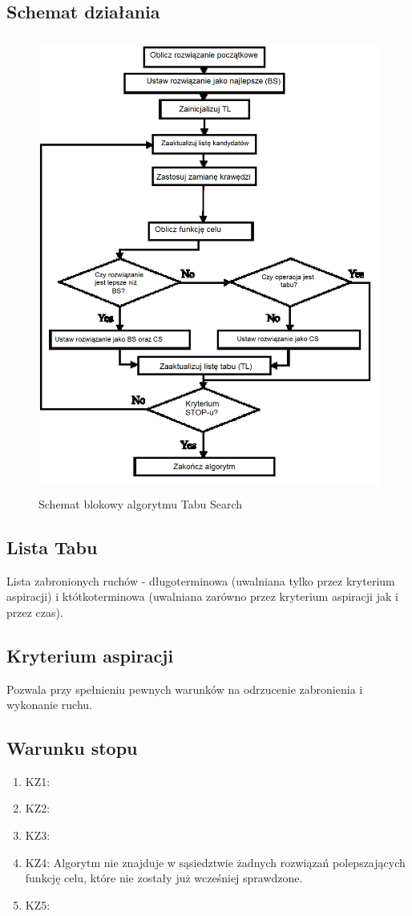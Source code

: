 \documentclass[12pt,a4paper]{article}
\begin{document}
\subsection{Schemat działania}
\begin{figure}[!h]
	\centering
	\includegraphics[height=150mm]{./ilustracje/taboo.png}
	\caption{Schemat blokowy algorytmu Tabu Search}
\end{figure}
\subsection{Lista Tabu}
Lista zabronionych ruchów - długoterminowa (uwalniana tylko przez kryterium aspiracji) i któtkoterminowa (uwalniana zarówno przez kryterium aspiracji jak i przez czas).

\subsection{Kryterium aspiracji}
Pozwala przy spełnieniu pewnych warunków na odrzucenie zabronienia i wykonanie ruchu.

\subsection{Warunku stopu}
\begin{enumerate}
\item KZ1:
\item KZ2:
\item KZ3:
\item KZ4: Algorytm nie znajduje w sąsiedztwie żadnych rozwiązań polepszających funkcję celu, które nie zostały już wcześniej sprawdzone.
\item KZ5:
\end{enumerate}
\end{document}
